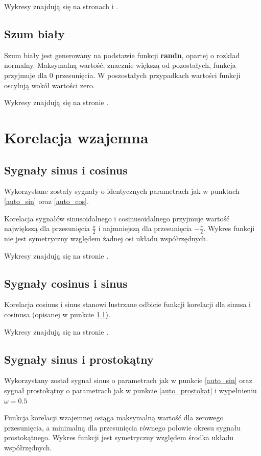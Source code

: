 \documentclass[wide,a4paper,titlepage,12pt]{mwart}
\begin{document}
		Wykresy znajdują się na stronach \pageref{wykres2} i \pageref{wykres3}.
		
	  \subsection{Szum biały}
		Szum biały jest generowany na podstawie funkcji \textbf{randn}, opartej o rozkład normalny. Maksymalną wartość, znacznie większą od pozostałych, funkcja przyjmuje dla 0 przesunięcia. W poszostałych przypadkach wartości funkcji oscylują wokół wartości zero.
		
    	Wykresy znajdują się na stronie \pageref{wykres2}.
		
		
  \section{Korelacja wzajemna}
	 \subsection{Sygnały sinus i cosinus}	
	 \label{cor_sin_cos}
		Wykorzystane zostały sygnały o identycznych parametrach jak w punktach \ref{auto_sin} oraz \ref{auto_cos}.
		
		Korelacja sygnałów sinusoidalnego i cosinusoidalnego przyjmuje wartość największą dla przesunięcia $\frac{\pi}{2}$ i najmniejszą dla przesunięcia  $-\frac{\pi}{2}$. Wykres funkcji nie jest symetryczny względem żadnej osi układu współrzędnych.
		
	 	Wykresy znajdują się na stronie \pageref{wykres4}.
	
	\subsection{Sygnały cosinus i sinus}
		Korelacja cosinus i sinus stanowi lustrzane odbicie funkcji korelacji dla sinusa i cosinusa (opisanej w punkcie \ref{cor_sin_cos}).
		
	 	Wykresy znajdują się na stronie \pageref{wykres4}.
	

	 \subsection{Sygnały sinus i prostokątny}	
		Wykorzystany został sygnał sinus o parametrach jak w punkcie \ref{auto_sin} oraz sygnał prostokątny o parametrach jak w punkcie \ref{auto_prostokat} i wypełnieniu $\omega=0.5$
		
		Funkcja korelacji wzajemnej osiąga maksymalną wartość dla zerowego przesunięcia, a minimalną dla przesunięcia równego połowie okresu sygnału prostokątnego. Wykres funkcji jest symetryczny względem środka układu współrzędnych.
					
\end{document}
